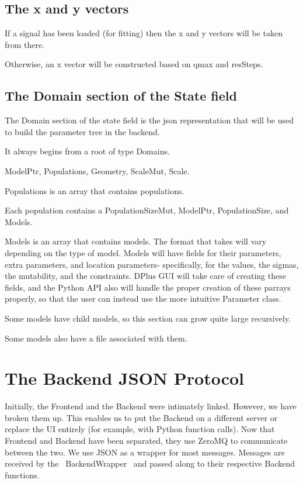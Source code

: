 \documentclass[12pt]{article}
\begin{document}
\subsection{The x and y vectors}
If a signal has been loaded (for fitting) then the x and y vectors will be taken from there.

Otherwise, an x vector will be constructed based on qmax and resSteps.

\subsection{The Domain section of the State field}

The Domain section of the state field is the json representation that will be used to build the parameter tree in the backend.

It always begins from a root of type Domains.

ModelPtr, Populations, Geometry, ScaleMut, Scale.

Populations is an array that contains populations. 

Each population contains a PopulationSizeMut, ModelPtr, PopulationSize, and Models.

Models is an array that contains models. The format that takes will vary depending on the type of model. Models will have fields for their parameters, extra parameters, and location parameters- specifically, for the values, the sigmas, the mutability, and the constraints. DPlus GUI will take care of creating these fields, and the Python API also will handle the proper creation of these parrays properly, so that the user can instead use the more intuitive Parameter class.

Some models have child models, so this section can grow quite large recursively.

Some models also have a file associated with them.





\section{The Backend JSON Protocol}
Initially, the Frontend and the Backend were intimately linked. However, we have broken them up. This enables us to put the Backend on a different server or replace the UI entirely (for example, with Python function calls). Now that Frontend and Backend have been separated, they use ZeroMQ to communicate between the two. We use JSON as a wrapper for most messages. Messages are received by the ~BackendWrapper~ and passed along to their respective Backend functions.
\end{document}
